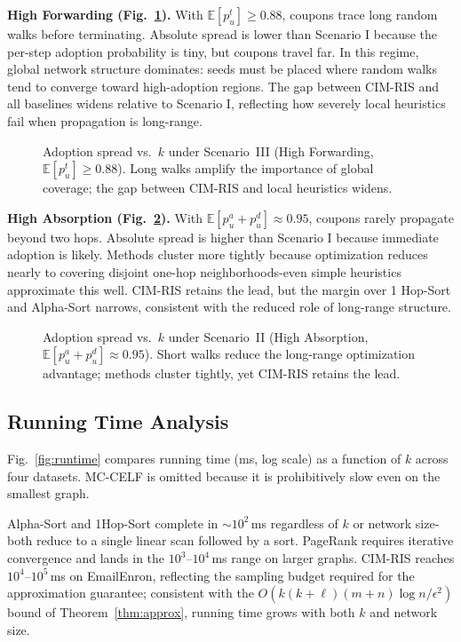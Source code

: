 \documentclass[sigconf]{acmart}
\newcommand{\CIMRIS}{\textsc{CIM-RIS}}
\newcommand{\E}{\mathbb{E}}
\begin{document}
\textbf{High Forwarding (Fig.~\ref{fig:high_fwd}).}
With $\E[p_u^t] \geq 0.88$, coupons trace long random walks before
terminating.
Absolute spread is lower than Scenario I because the per-step adoption
probability is tiny, but coupons travel far.
In this regime, global network structure dominates: seeds must be placed
where random walks tend to converge toward high-adoption regions.
The gap between \CIMRIS{} and all baselines widens relative to Scenario
I, reflecting how severely local heuristics fail when propagation is
long-range.

\begin{figure}[t]
  \centering
  \caption{Adoption spread vs.\ $k$ under Scenario~III (High
    Forwarding, $\E[p_u^t] \geq 0.88$).
    Long walks amplify the importance of global coverage; the gap
    between \CIMRIS{} and local heuristics widens.}
  \label{fig:high_fwd}
\end{figure}

\textbf{High Absorption (Fig.~\ref{fig:high_abs}).}
With $\E[p_u^a + p_u^d] \approx 0.95$, coupons rarely propagate beyond
two hops.
Absolute spread is higher than Scenario I because immediate adoption is
likely.
Methods cluster more tightly because optimization reduces nearly to
covering disjoint one-hop neighborhoods-even simple heuristics
approximate this well.
\CIMRIS{} retains the lead, but the margin over 1 Hop-Sort and Alpha-Sort
narrows, consistent with the reduced role of long-range structure.

\begin{figure}[t]
  \centering
  \caption{Adoption spread vs.\ $k$ under Scenario~II (High
    Absorption, $\E[p_u^a + p_u^d] \approx 0.95$).
    Short walks reduce the long-range optimization advantage; methods
    cluster tightly, yet \CIMRIS{} retains the lead.}
  \label{fig:high_abs}
\end{figure}

\subsection{Running Time Analysis}
\label{sec:exp-runtime}

Fig.~\ref{fig:runtime} compares running time (ms, log scale) as a
function of $k$ across four datasets.
MC-CELF is omitted because it is prohibitively slow even on the
smallest graph.

Alpha-Sort and 1Hop-Sort complete in ${\sim}10^2$\,ms regardless of
$k$ or network size-both reduce to a single linear scan followed by
a sort.
PageRank requires iterative convergence and lands in the
$10^3$--$10^4$\,ms range on larger graphs.
\CIMRIS{} reaches $10^4$--$10^5$\,ms on EmailEnron, reflecting the
sampling budget required for the approximation guarantee; consistent
with the $O(k(k+\ell)(m+n)\log n/\epsilon^2)$ bound of
Theorem~\ref{thm:approx}, running time grows with both $k$ and
network size.
\end{document}
